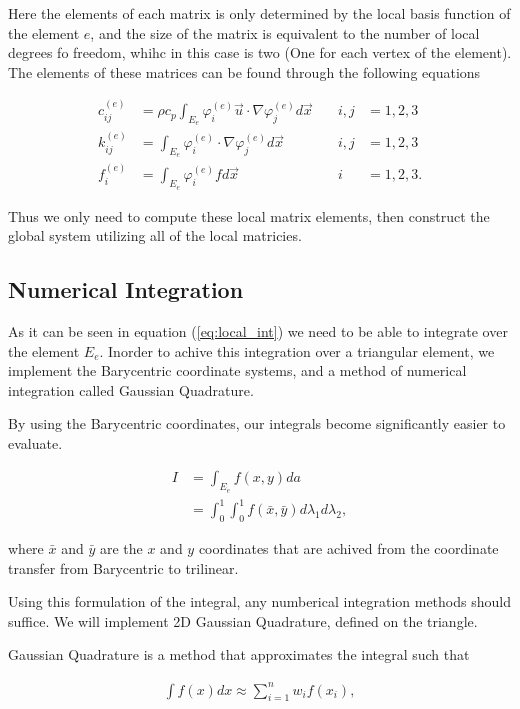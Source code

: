 \documentclass[../fem.tex]{subfiles}
\begin{document}
Here the elements of each matrix is only determined by the local basis function
of the element $e$, and the size of the matrix is equivalent to the number of
local degrees fo freedom, whihc in this case is two (One for each vertex of the
element). The elements of these matrices can be found through the following
equations

\begin{align}\label{eq:local_int}
  c_{ij}^{(e)}&=\rho
  c_p\int_{E_e}\varphi_i^{(e)}\vec{u}\cdot\nabla\varphi_j^{(e)}d\vec{x}\quad&i,j&=1,2,3\\
  k_{ij}^{(e)}&=\int_{E_e}\varphi_i^{(e)}\cdot\nabla\varphi_j^{(e)}d\vec{x}\quad&i,j&=1,2,3\\
  f_i^{(e)}&=\int_{E_e}\varphi_i^{(e)}fd\vec{x}\quad&i&=1,2,3.
\end{align}

Thus we only need to compute these local matrix elements, then construct the
global system utilizing all of the local matricies.

\subsection{Numerical Integration}%
\label{sub:numerical_integration}

As it can be seen in equation (\ref{eq:local_int}) we need to be able to
integrate over the element $E_e$. Inorder to achive this integration over a
triangular element, we implement the Barycentric coordinate systems, and a
method of numerical integration called Gaussian Quadrature.

By using the Barycentric coordinates, our integrals become significantly easier
to evaluate.

\begin{align*}
  I&=\int_{E_e}f(x,y)da\\
   &=\int_0^1\int_0^1f\left(\bar{x}, \bar{y}\right)d\lambda_1 d\lambda_2,
\end{align*}

where $\bar{x}$ and $\bar{y}$ are the $x$ and $y$ coordinates that are achived
from the coordinate transfer from Barycentric to trilinear.

Using this formulation of the integral, any numberical integration methods
should suffice. We will implement 2D Gaussian Quadrature, defined on the
triangle.

Gaussian Quadrature is a method that approximates the integral such that

\begin{align*}
  \int f(x)dx\approx \sum_{i=1}^nw_if(x_i),
\end{align*}
\end{document}
